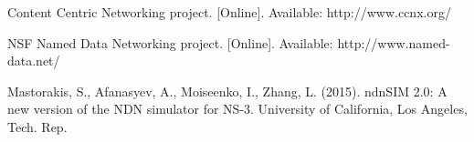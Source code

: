 \begin{thebibliography}{99}

\bibitem{}
Content Centric Networking project.
[Online]. Available:
http://www.ccnx.org/

\bibitem{}
NSF Named Data Networking project. [Online]. Available:
http://www.named-data.net/

\bibitem{}
Mastorakis, S., Afanasyev, A., Moiseenko, I., Zhang, L. (2015). ndnSIM 2.0: A new version of the NDN simulator for NS-3. University of California, Los Angeles, Tech. Rep.


\end{thebibliography}
